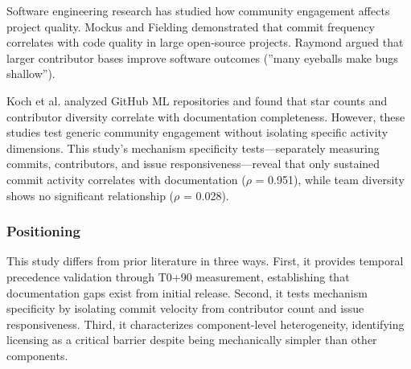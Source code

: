 Software engineering research has studied how community engagement affects project quality. Mockus and Fielding demonstrated that commit frequency correlates with code quality in large open-source projects. Raymond argued that larger contributor bases improve software outcomes (''many eyeballs make bugs shallow'').

Koch et al. analyzed GitHub ML repositories and found that star counts and contributor diversity correlate with documentation completeness. However, these studies test generic community engagement without isolating specific activity dimensions. This study's mechanism specificity tests---separately measuring commits, contributors, and issue responsiveness---reveal that only sustained commit activity correlates with documentation ($\rho$ = 0.951), while team diversity shows no significant relationship ($\rho$ = 0.028).

\subsubsection{Positioning}

This study differs from prior literature in three ways. First, it provides temporal precedence validation through T0+90 measurement, establishing that documentation gaps exist from initial release. Second, it tests mechanism specificity by isolating commit velocity from contributor count and issue responsiveness. Third, it characterizes component-level heterogeneity, identifying licensing as a critical barrier despite being mechanically simpler than other components.
